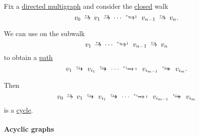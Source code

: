 \begin{algorithm}\label{alg:closed_walk_to_cycle}
  Fix a \hyperref[def:hypergraph/multigraph]{directed multigraph} and consider the  \hyperref[def:graph_walk/closed]{closed} walk
  \begin{equation}\label{eq:alg:closed_walk_to_cycle/src}
    v_0 \reloset {e_1} \to v_1 \reloset {e_2} \to \cdots \reloset {e_{n-1}} \to v_{n-1} \reloset {e_n} \to v_n.
  \end{equation}

  We can use  on the subwalk
  \begin{equation*}
    v_1 \reloset {e_2} \to \cdots \reloset {e_{n-1}} \to v_{n-1} \reloset {e_n} \to v_n
  \end{equation*}
  to obtain a \hyperref[def:graph_walk/path]{path}
  \begin{equation*}
    v_1 \reloset {e_{i_1}} \to v_{i_1} \reloset {e_{i_2}} \to \cdots \reloset {e_{i_{m-1}}} \to v_{i_{m-1}} \reloset {e_{i_m}} \to v_{i_m}.
  \end{equation*}

  Then
  \begin{equation}\label{eq:alg:closed_walk_to_cycle/dest}
    v_0 \reloset {e_1} \to v_1 \reloset {e_{i_1}} \to v_{i_1} \reloset {e_{i_2}} \to \cdots \reloset {e_{i_{m-1}}} \to v_{i_{m-1}} \reloset {e_{i_m}} \to v_{i_m}
  \end{equation}
  is a \hyperref[def:graph_cycle]{cycle}.
\end{algorithm}

\paragraph{Acyclic graphs}


